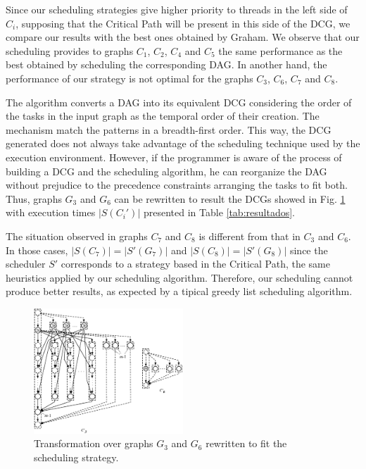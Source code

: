 \documentclass[twocolumn]{svjour3}
\begin{document}
Since our scheduling strategies give higher priority to threads in the left side of $C_i$, supposing that the Critical Path will be present in this side of the DCG, we compare our results with the best ones obtained by Graham. We observe that our scheduling provides to graphs $C_1$, $C_2$, $C_4$ and $C_5$ the same performance as the best obtained by scheduling the corresponding DAG. In another hand, the performance of our strategy is not optimal for the graphs $C_3$, $C_6$, $C_7$ and $C_8$.

The algorithm converts a DAG into its equivalent DCG considering the order of the tasks in the input graph as the temporal order of their creation. The mechanism match the patterns in a breadth-first order. This way, the DCG generated does not always take advantage of the scheduling technique used by the execution environment. However, if the programmer is aware of the process of building a DCG and the scheduling algorithm, he can reorganize the DAG without prejudice to the precedence constraints arranging the tasks to fit both. Thus, graphs $G_3$ and $G_6$ can be rewritten to result the DCGs showed in Fig. \ref{fig:newC3C6} with execution times $|S(C_i')|$ presented in Table \ref{tab:resultados}.

The situation observed in graphs $C_7$ and $C_8$ is different from that in $C_3$ and $C_6$. In those cases, $|S(C_7)| = |S'(G_7)|$ and $|S(C_8)| = |S'(G_8)|$ since the scheduler $S'$ corresponds to a strategy based in the Critical Path, the same heuristics applied by our scheduling algorithm. Therefore, our scheduling cannot produce better results, as expected by a tipical greedy list scheduling algorithm.

\begin{figure}[htb]
\begin{center}
\includegraphics[width=0.5\textwidth,angle=0]{figs/cl3_cl6.eps}
\caption{Transformation over graphs $G_3$ and $G_6$ rewritten to fit the scheduling strategy.}
\label{fig:newC3C6}
\end{center}
\end{figure}
\end{document}
